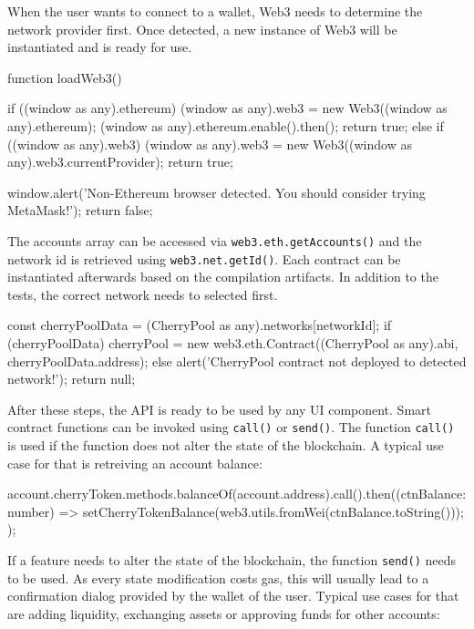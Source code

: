 When the user wants to connect to a wallet, Web3 needs to determine the network provider first. Once detected, a new instance of Web3 will be instantiated and is ready for use.

\begin{JsCode}
function loadWeb3() {
  if ((window as any).ethereum) {
    (window as any).web3 = new Web3((window as any).ethereum);
    (window as any).ethereum.enable().then();
    return true;
  } else if ((window as any).web3) {
    (window as any).web3 = new Web3((window as any).web3.currentProvider);
    return true;
  }

  window.alert('Non-Ethereum browser detected. You should consider trying MetaMask!');
  return false;
}	
\end{JsCode}

The accounts array can be accessed via \texttt{web3.eth.getAccounts()} and the network id is retrieved using \texttt{web3.net.getId()}. Each contract can be instantiated afterwards based on the compilation artifacts. In addition to the tests, the correct network needs to selected first.

\begin{JsCode}
const cherryPoolData = (CherryPool as any).networks[networkId];
if (cherryPoolData) {
  cherryPool = new web3.eth.Contract((CherryPool as any).abi, cherryPoolData.address);
} else {
  alert('CherryPool contract not deployed to detected network!');
  return null;
}	
\end{JsCode}

After these steps, the API is ready to be used by any UI component. Smart contract functions can be invoked using \texttt{call()} or \texttt{send()}. The function \texttt{call()} is used if the function does not alter the state of the blockchain. A typical use case for that is retreiving an account balance:

\begin{JsCode}
account.cherryToken.methods.balanceOf(account.address).call().then((ctnBalance: number) => {
  setCherryTokenBalance(web3.utils.fromWei(ctnBalance.toString()));
});
          
\end{JsCode}

If a feature needs to alter the state of the blockchain, the function \texttt{send()} needs to be used. As every state modification costs gas, this will usually lead to a confirmation dialog provided by the wallet of the user. Typical use cases for that are adding liquidity, exchanging assets or approving funds for other accounts:


